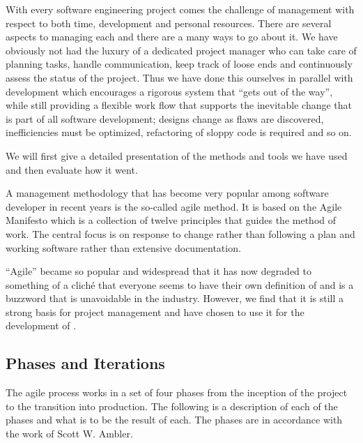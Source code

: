 With every software engineering project comes the challenge of management with
respect to both time, development and personal resources. There are several
aspects to managing each and there are a many ways to go about it. We have
obviously not had the luxury of a dedicated project manager who can take care of
planning tasks, handle communication, keep track of loose ends and continuously
assess the status of the project. Thus we have done this ourselves in parallel
with development which encourages a rigorous system that ``gets out of the
way'', while still providing a flexible work flow that supports the inevitable
change that is part of all software development; designs change as flaws are
discovered, inefficiencies must be optimized, refactoring of sloppy code is
required and so on.

We will first give a detailed presentation of the methods and tools we have used
and then evaluate how it went.

A management methodology that has become very popular among software developer
in recent years is the so-called agile method. It is based on the Agile
Manifesto\cite{agile-manifesto} which is a collection of twelve principles that
guides the method of work. The central focus is on response to change rather
than following a plan and working software rather than extensive documentation.

``Agile'' became so popular and widespread that it has now degraded to something
of a clich\'e that everyone seems to have their own definition of and is a
buzzword that is unavoidable in the industry. However, we find that it is still
a strong basis for project management and have chosen to use it for the
development of \thename{}.

\subsection{Phases and Iterations}
\label{sec:project-mgmt:phases}

The agile process works in a set of four phases from the inception of the
project to the transition into production. The following is a description of
each of the phases and what is to be the result of each. The phases are in
accordance with the work of Scott W. Ambler\cite{aup}.

